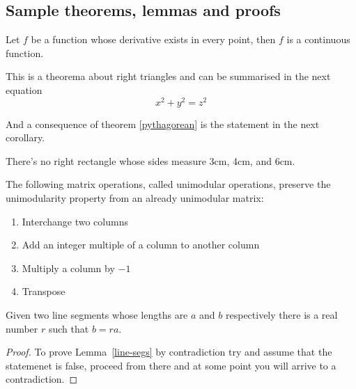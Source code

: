 \subsection{Sample theorems, lemmas and proofs}

\begin{theorem}
Let $f$ be a function whose derivative exists in every point, then $f$ is 
a continuous function.
\end{theorem}
 
\begin{theorem}
\label{pythagorean}
This is a theorema about right triangles and can be summarised in the next 
equation 
\[ x^2 + y^2 = z^2 \]
\end{theorem}
 
And a consequence of theorem \ref{pythagorean} is the statement in the next 
corollary.
 
\begin{corollary}
There's no right rectangle whose sides measure 3cm, 4cm, and 6cm.
\end{corollary}

\begin{lemma}
The following matrix operations, called unimodular operations, preserve the unimodularity property from an already unimodular matrix:
\begin{enumerate}
    \item Interchange two columns
    \item Add an integer multiple of a column to another column
    \item Multiply a column by $-1$
    \item Transpose
\end{enumerate}
\end{lemma}

\begin{lemma}
\label{line-segs}
Given two line segments whose lengths are $a$ and $b$ respectively there 
is a real number $r$ such that $b=ra$.
\end{lemma}
 
\begin{proof}
To prove Lemma~\ref{line-segs} by contradiction try and assume that the statemenet is false,
proceed from there and at some point you will arrive to a contradiction.
\end{proof}

